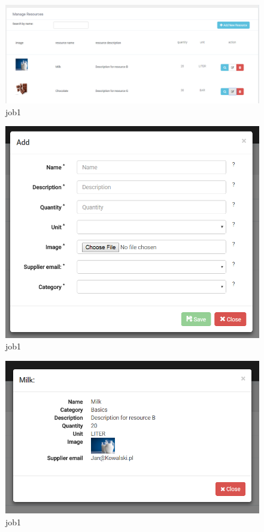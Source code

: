 \documentclass[a4paper,11pt,twoside]{report}
\theoremstyle{definition}
\begin{document}
\begin{figure}[h!]
\begin{center}
\includegraphics[width=\textwidth]{AS/resources/1}
\end{center}
\caption{job1}
\end{figure}
\thispagestyle{empty}


\begin{figure}[h!]
\begin{center}
\includegraphics[width=\textwidth]{AS/resources/2}
\end{center}
\caption{job1}
\end{figure}
\thispagestyle{empty}


\begin{figure}[h!]
\begin{center}
\includegraphics[width=\textwidth]{AS/resources/3}
\end{center}
\caption{job1}
\end{figure}
\thispagestyle{empty}
\end{document}
